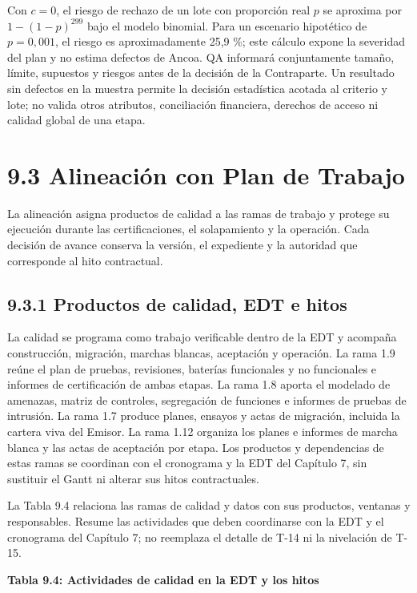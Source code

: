 \documentclass[11pt]{article}
\begin{document}
Con $c=0$, el riesgo de rechazo de un lote con proporción real $p$ se aproxima por $1-(1-p)^{299}$ bajo el modelo binomial. Para un escenario hipotético de $p=0{,}001$, el riesgo es aproximadamente 25,9 \%; este cálculo expone la severidad del plan y no estima defectos de Ancoa. QA informará conjuntamente tamaño, límite, supuestos y riesgos antes de la decisión de la Contraparte. Un resultado sin defectos en la muestra permite la decisión estadística acotada al criterio y lote; no valida otros atributos, conciliación financiera, derechos de acceso ni calidad global de una etapa.

\section{9.3 Alineación con Plan de Trabajo}

La alineación asigna productos de calidad a las ramas de trabajo y protege su ejecución durante las certificaciones, el solapamiento y la operación. Cada decisión de avance conserva la versión, el expediente y la autoridad que corresponde al hito contractual.

\subsection{9.3.1 Productos de calidad, EDT e hitos}

La calidad se programa como trabajo verificable dentro de la EDT y acompaña construcción, migración, marchas blancas, aceptación y operación. La rama 1.9 reúne el plan de pruebas, revisiones, baterías funcionales y no funcionales e informes de certificación de ambas etapas. La rama 1.8 aporta el modelado de amenazas, matriz de controles, segregación de funciones e informes de pruebas de intrusión. La rama 1.7 produce planes, ensayos y actas de migración, incluida la cartera viva del Emisor. La rama 1.12 organiza los planes e informes de marcha blanca y las actas de aceptación por etapa. Los productos y dependencias de estas ramas se coordinan con el cronograma y la EDT del Capítulo 7, sin sustituir el Gantt ni alterar sus hitos contractuales.

La Tabla 9.4 relaciona las ramas de calidad y datos con sus productos, ventanas y responsables. Resume las actividades que deben coordinarse con la EDT y el cronograma del Capítulo 7; no reemplaza el detalle de T-14 ni la nivelación de T-15.

\textbf{Tabla 9.4: Actividades de calidad en la EDT y los hitos}
\end{document}
